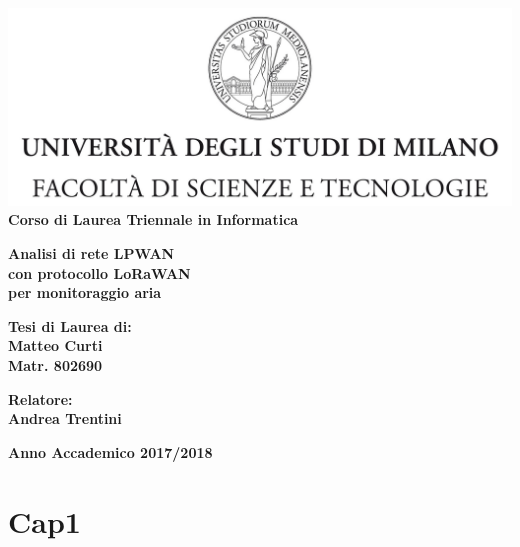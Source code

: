 \documentclass[a4paper]{report} %
\begin{document}
\hypersetup{pageanchor=false}
\begin{titlepage}
\begin{center}
\includegraphics[width=\textwidth]{Logo.jpg}\\
{\large{\bf Corso di Laurea Triennale in Informatica}}
\end{center}
\vspace{12mm}
\begin{center}
{\huge{\bf Analisi di rete LPWAN}}\\
\vspace{4mm}
{\huge{\bf con protocollo LoRaWAN}}\\
\vspace{4mm}
{\huge{\bf per monitoraggio aria}}\\
\end{center}
\vspace{12mm}
\begin{flushright}
{\large{\bf Tesi di Laurea di:}}\\
{\large{\bf Matteo Curti}}\\
{\large{\bf Matr. 802690}}\\
\end{flushright}
\vspace{4mm}
\begin{flushleft}
{\large{\bf Relatore:}}\\
{\large{\bf Andrea Trentini}}\\
\vspace{4mm}
\end{flushleft}
\vspace{12mm}
\begin{center}
{\large{\bf Anno Accademico 2017/2018}}
\end{center}
\end{titlepage}
\tableofcontents
\chapter{Cap1}
\end{document}
